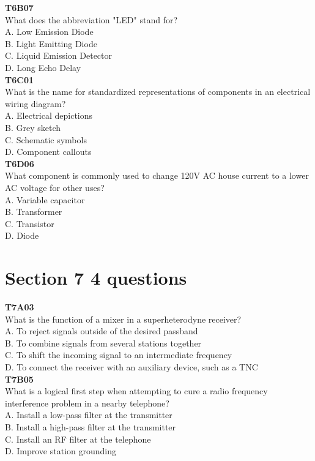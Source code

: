 \documentclass[12pt,letterpaper,twocolumn]{report}
\begin{document}
\textbf{T6B07}\\
What does the abbreviation "LED" stand for?\\
A. Low Emission Diode\\
B. Light Emitting Diode\\
C. Liquid Emission Detector\\
D. Long Echo Delay\\

\textbf{T6C01}\\
What is the name for standardized representations of components in an electrical wiring diagram?\\
A. Electrical depictions\\
B. Grey sketch\\
C. Schematic symbols\\
D. Component callouts\\

\textbf{T6D06}\\
What component is commonly used to change 120V AC house current to a lower AC voltage for other uses?\\
A. Variable capacitor\\
B. Transformer\\
C. Transistor\\
D. Diode\\

\section{Section 7 4 questions}

\textbf{T7A03}\\
What is the function of a mixer in a superheterodyne receiver?\\
A. To reject signals outside of the desired passband\\
B. To combine signals from several stations together\\
C. To shift the incoming signal to an intermediate frequency\\
D. To connect the receiver with an auxiliary device, such as a TNC\\

\textbf{T7B05}\\
What is a logical first step when attempting to cure a radio frequency interference problem in a nearby telephone?\\
A. Install a low-pass filter at the transmitter\\
B. Install a high-pass filter at the transmitter\\
C. Install an RF filter at the telephone\\
D. Improve station grounding\\
\end{document}
